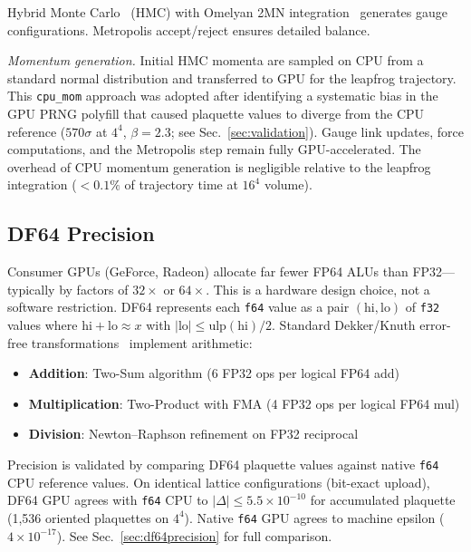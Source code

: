 \documentclass[aps,prl,twocolumn,superscriptaddress,showpacs]{revtex4-2}
\begin{document}
Hybrid Monte Carlo~\cite{duane1987} (HMC) with Omelyan 2MN
integration~\cite{omelyan2003,takaishi2006} generates gauge
configurations. Metropolis accept/reject ensures detailed balance.

\textit{Momentum generation.} Initial HMC momenta are sampled on CPU
from a standard normal distribution and transferred to GPU for the
leapfrog trajectory. This \texttt{cpu\_mom} approach was adopted after
identifying a systematic bias in the GPU PRNG polyfill that caused
plaquette values to diverge from the CPU reference ($570\sigma$ at
$4^4$, $\beta = 2.3$; see Sec.~\ref{sec:validation}). Gauge link
updates, force computations, and the Metropolis step remain fully
GPU-accelerated. The overhead of CPU momentum generation is negligible
relative to the leapfrog integration ($< 0.1\%$ of trajectory time at
$16^4$ volume).

\subsection{DF64 Precision}

Consumer GPUs (GeForce, Radeon) allocate far fewer FP64 ALUs than
FP32---typically by factors of $32\times$ or $64\times$. This is a
hardware design choice, not a software restriction. DF64 represents each
\texttt{f64} value as a pair $(\mathrm{hi}, \mathrm{lo})$ of
\texttt{f32} values where $\mathrm{hi} + \mathrm{lo} \approx x$ with
$|\mathrm{lo}| \leq \mathrm{ulp}(\mathrm{hi})/2$. Standard
Dekker/Knuth error-free transformations~\cite{dekker1971,bailey2005}
implement arithmetic:

\begin{itemize}
\item \textbf{Addition}: Two-Sum algorithm (6 FP32 ops per logical
  FP64 add)
\item \textbf{Multiplication}: Two-Product with FMA (4 FP32 ops per
  logical FP64 mul)
\item \textbf{Division}: Newton--Raphson refinement on FP32 reciprocal
\end{itemize}

Precision is validated by comparing DF64 plaquette values against native
\texttt{f64} CPU reference values. On identical lattice configurations
(bit-exact upload), DF64 GPU agrees with \texttt{f64} CPU to
$|\Delta| \leq 5.5 \times 10^{-10}$ for accumulated plaquette (1,536
oriented plaquettes on $4^4$). Native \texttt{f64} GPU agrees to machine
epsilon ($4 \times 10^{-17}$). See Sec.~\ref{sec:df64precision} for full
comparison.
\end{document}
